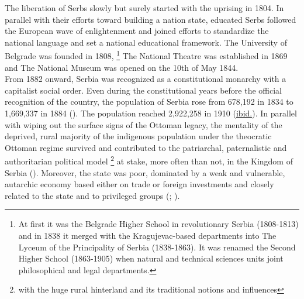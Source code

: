 \documentclass[11pt]{report}
\begin{document}
{{{{The  liberation  of  Serbs  slowly  but  surely  started  with  the  uprising  in  1804.   In parallel with  their  efforts  toward  building a  nation  state,  educated  Serbs  followed  the  European  wave  of enlightenment  and  joined  efforts  to  standardize  the  national  language  and  set  a  national educational framework. The University of Belgrade was founded in 1808,
\footnote{At first it was the Belgrade Higher School in revolutionary Serbia (1808-1813) and in 1838 it merged with the Kragujevac-based departments into The Lyceum of the Principality of Serbia (1838-1863). It was renamed the Second Higher School (1863-1905) when natural and technical sciences units joint philosophical and legal departments.}
The National Theatre was established in 1869 and The National Museum was opened on the 10th of May 1844.
\\

From 1882 onward, Serbia was recognized as a constitutional monarchy with a capitalist social order. Even during the constitutional years before the official recognition of the country, the population of Serbia rose from 678,192 in 1834 to 1,669,337 in 1884 (\href{Zavod}{\citealt{zavod_za_statistiku_i_evidenciju_nr_srbije_stanovnistvo_1953}}).
The population reached 2,922,258 in 1910 (\href{Zavod}{ibid.}). 
In parallel with wiping out the surface signs of the Ottoman legacy, the mentality of the deprived, rural majority of the indigenous population under the theocratic Ottoman regime survived and contributed to the patriarchal, paternalistic and authoritarian political model
\footnote{with the huge rural hinterland and its traditional notions and influences}
at stake, more often than not, in the Kingdom of Serbia (\href{Vukmirovic}{\citealt{vukmirovic_city_2013}}). Moreover, the state was poor, dominated by a weak and vulnerable, autarchic economy based either on trade or foreign investments and closely related to the state and to privileged groups (\href{Vukmirovic}{\citealt{vukmirovic_city_2013}}; \href{Samardzic}{\citealt{doytchinov_belgrade_2015}}).
\\

}}}}
\end{document}
